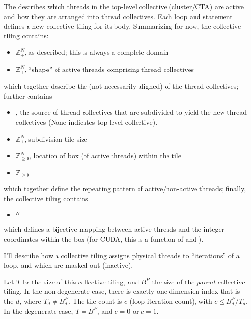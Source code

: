 The  describes which threads in the top-level collective (cluster/CTA) are active and how they are arranged into thread collectives.
Each  loop and  statement defines a new collective tiling for its body.
Summarizing for now, the collective tiling contains:
\begin{itemize}
  \item {} $\mathbb{Z}^N_+$, as described; this is always a complete domain
  \item {} $\mathbb{Z}^N_+$, ``shape'' of active threads comprising thread collectives
\end{itemize}
\filbreak
which together describe the (not-necessarily-aligned)  of the thread collectives; further contains
\begin{itemize}
  \item {} , the source of thread collectives that are subdivided to yield the new thread collectives (None indicates top-level collective).
  \filbreak
  \item {} $\mathbb{Z}^N_+$, subdivision tile size
  \filbreak
  \item {} $\mathbb{Z}^N_{\ge 0}$, location of box (of active threads) within the tile
  \filbreak
  \item {} $\mathbb{Z}_{\ge 0}$
\end{itemize}
which together define the repeating pattern of active/non-active threads; finally, the collective tiling contains
\filbreak
\begin{itemize}
  \item {} $^N$
\end{itemize}
which defines a bijective mapping between active threads and the integer coordinates within the box (for CUDA, this is a function of  and ).

\filbreak
{}

I'll describe how a collective tiling assigns physical threads to ``iterations'' of a  loop, and which are masked out (inactive).

\filbreak
{} Let $T$ be the  size of this collective tiling, and $B^P$ the  size of the \textit{parent} collective tiling.
In the non-degenerate case, there is exactly one dimension index that is the  $d$, where $T_d \ne B^P_d$.
The tile count is $c$ (loop iteration count), with $c \le B^P_d / T_d$.
In the degenerate case, $T = B^P$, and $c = 0$ or $c = 1$.

